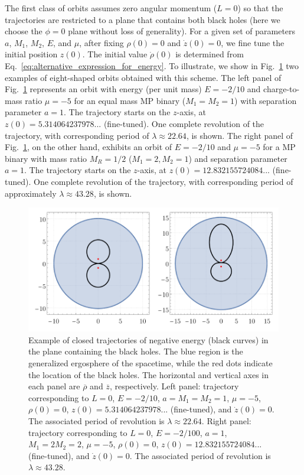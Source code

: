 The first class of orbits assumes zero angular momentum ($L=0$) so that the trajectories are restricted to a plane that contains both black holes (here we choose the $\phi=0$ plane without loss of generality). For a given set of parameters $a$, $M_1$, $M_2$, $E$, and $\mu$, after fixing $\rho(0) = 0$ and $\dot{z}(0) = 0$, we fine tune the initial position $z(0)$. The initial value $\dot{\rho} (0)$ is determined from Eq.~\eqref{eq:alternative_expression_for_energy}. To illustrate, we show in Fig.~\ref{fig:orbit_closed_bh} two examples of eight-shaped orbits obtained with this scheme. The left panel of Fig.~\ref{fig:orbit_closed_bh} represents an orbit with energy (per unit mass) $E=-2/10$ and charge-to-mass ratio $\mu=-5$ for an equal mass \ac{MP} binary ($M_1=M_2=1$) with separation parameter $a=1$. The trajectory starts on the $z$-axis, at $z(0) = 5.314064237978...$ (fine-tuned). One complete revolution of the trajectory, with corresponding period of $\lambda \approx 22.64$, is shown. The right panel of Fig.~\ref{fig:orbit_closed_bh}, on the other hand, exhibits an orbit of $E=-2/10$ and $\mu=-5$ for a \ac{MP} binary with mass ratio $M_R=1/2$ ($M_1=2,M_2=1$) and separation parameter $a=1$. The trajectory starts on the $z$-axis, at $z(0) = 12.832155724084...$ (fine-tuned). One complete revolution of the trajectory, with corresponding period of approximately $\lambda \approx 43.28$, is shown.

\begin{figure}[!ht]
  \centering
  \includegraphics[width=\linewidth]{img/penrose_binaries/fig4.pdf}
  \caption{Example of closed trajectories of negative energy (black curves) in the plane containing the black holes. The blue region is the generalized ergosphere of the spacetime, while the red dots indicate the location of the black holes. The horizontal and vertical axes in each panel are $\overline \rho$ and $\overline z$, respectively. Left panel: trajectory corresponding to $L=0$, $E=-2/10$, $a=M_1=M_2=1$, $\mu = -5$, $\rho(0) = 0$, $z(0) = 5.314064237978...$ (fine-tuned), and $\dot{z}(0) = 0$. The associated period of revolution is $\lambda \approx 22.64$.  Right panel: trajectory corresponding to $L=0$, $E=-2/100$, $a=1$, $M_1=2 M_2= 2$, $\mu = -5$, $\rho(0) = 0$, $z(0) = 12.832155724084...$ (fine-tuned), and $\dot{z}(0) = 0$. The associated period of revolution is $\lambda \approx 43.28$. }
  \label{fig:orbit_closed_bh}
\end{figure}

